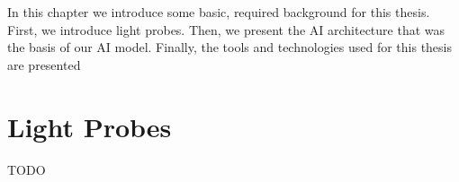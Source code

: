 In this chapter we introduce some basic, required background for this thesis. First, we introduce light probes. Then, we present the AI architecture that was the basis of our AI model. Finally, the tools and technologies used for this thesis are presented

\section{Light Probes}
TODO
